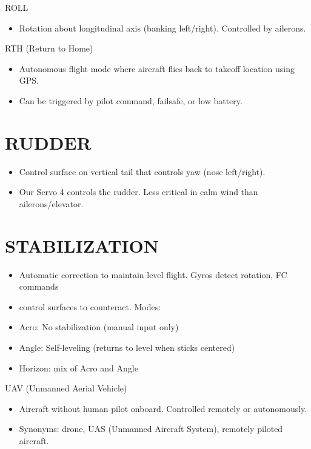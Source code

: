 \documentclass[11pt,letterpaper]{article}
\begin{document}
ROLL\par

\begin{itemize}
  \item Rotation about longitudinal axis (banking left/right). Controlled by ailerons.
\end{itemize}

RTH (Return to Home)\par

\begin{itemize}
  \item Autonomous flight mode where aircraft flies back to takeoff location using GPS.
  \item Can be triggered by pilot command, failsafe, or low battery.
\end{itemize}

\section{RUDDER}

\begin{itemize}
  \item Control surface on vertical tail that controls yaw (nose left/right).
  \item Our Servo 4 controls the rudder. Less critical in calm wind than ailerons/elevator.
\end{itemize}

\section{STABILIZATION}

\begin{itemize}
  \item Automatic correction to maintain level flight. Gyros detect rotation, FC commands
  \item control surfaces to counteract. Modes:
  \item Acro: No stabilization (manual input only)
  \item Angle: Self-leveling (returns to level when sticks centered)
  \item Horizon: mix of Acro and Angle
\end{itemize}

UAV (Unmanned Aerial Vehicle)\par

\begin{itemize}
  \item Aircraft without human pilot onboard. Controlled remotely or autonomously.
  \item Synonyms: drone, UAS (Unmanned Aircraft System), remotely piloted aircraft.
\end{itemize}
\end{document}
